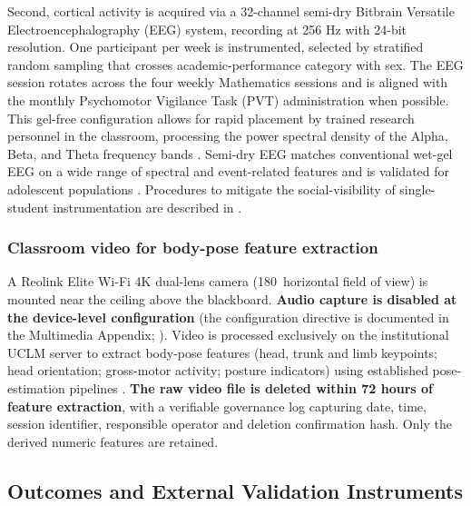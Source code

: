 Second, cortical activity is acquired via a 32-channel semi-dry Bitbrain Versatile Electroencephalography (EEG) system, recording at 256 Hz with 24-bit resolution. One participant per week is instrumented, selected by stratified random sampling that crosses academic-performance category with sex. The EEG session rotates across the four weekly Mathematics sessions and is aligned with the monthly Psychomotor Vigilance Task (PVT) administration when possible. This gel-free configuration allows for rapid placement by trained research personnel in the classroom, processing the power spectral density of the Alpha, Beta, and Theta frequency bands \parencite{ramirez-moreno_eeg-based_2021, apicella_eeg-based_2022}. Semi-dry EEG matches conventional wet-gel EEG on a wide range of spectral and event-related features and is validated for adolescent populations \parencite{LopezGordo2014_dry_eeg,DiFlumeri2019_dry_eeg_validation,Hinrichs2020_motion_artifacts,LauZhu2019_mobile_eeg_review}. Procedures to mitigate the social-visibility of single-student instrumentation are described in .

\subsubsection{Classroom video for body-pose feature extraction}

A Reolink Elite Wi-Fi 4K dual-lens camera (180\textdegree\ horizontal field of view) is mounted near the ceiling above the blackboard. \textbf{Audio capture is disabled at the device-level configuration} (the configuration directive is documented in the Multimedia Appendix; ). Video is processed exclusively on the institutional UCLM server to extract body-pose features (head, trunk and limb keypoints; head orientation; gross-motor activity; posture indicators) using established pose-estimation pipelines \parencite{Cao2021_openpose,Lugaresi2019_mediapipe,Sun2019_hrnet,Jocher2023_yolov8}. \textbf{The raw video file is deleted within 72 hours of feature extraction}, with a verifiable governance log capturing date, time, session identifier, responsible operator and deletion confirmation hash. Only the derived numeric features are retained.

\subsection{Outcomes and External Validation Instruments}\label{subsec:outcomes}

